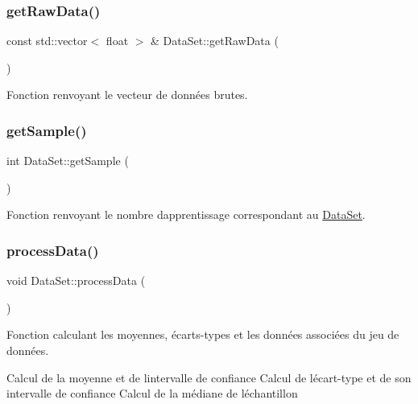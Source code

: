 \subsubsection{\texorpdfstring{get\+Raw\+Data()}{getRawData()}}
{\footnotesize\ttfamily const std\+::vector$<$ float $>$ \& Data\+Set\+::get\+Raw\+Data (\begin{DoxyParamCaption}{ }\end{DoxyParamCaption})}



Fonction renvoyant le vecteur de données brutes. 

\mbox{\label{classDataSet_a29e3936319d5b2fda4f74b033c556766}} 
\subsubsection{\texorpdfstring{get\+Sample()}{getSample()}}
{\footnotesize\ttfamily int Data\+Set\+::get\+Sample (\begin{DoxyParamCaption}{ }\end{DoxyParamCaption})}



Fonction renvoyant le nombre d\textquotesingle{}apprentissage correspondant au \hyperlink{classDataSet}{Data\+Set}. 

\mbox{\label{classDataSet_a6e174dbffadb1a262c6cc92781d0bd12}} 
\subsubsection{\texorpdfstring{process\+Data()}{processData()}}
{\footnotesize\ttfamily void Data\+Set\+::process\+Data (\begin{DoxyParamCaption}{ }\end{DoxyParamCaption})}



Fonction calculant les moyennes, écarts-\/types et les données associées du jeu de données. 

Calcul de la moyenne et de l\textquotesingle{}intervalle de confiance Calcul de l\textquotesingle{}écart-\/type et de son intervalle de confiance Calcul de la médiane de l\textquotesingle{}échantillon 

